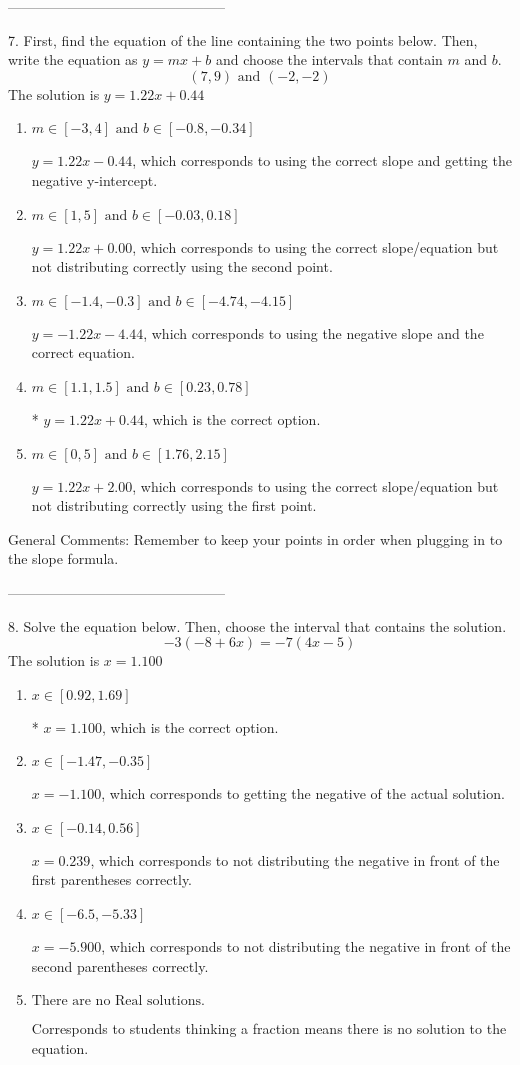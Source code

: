 \documentclass{extbook}[14pt]
\begin{document}
-----------------------------------------------

7. First, find the equation of the line containing the two points below. Then, write the equation as $ y=mx+b $ and choose the intervals that contain $m$ and $b$.
\[ (7, 9) \text{ and } (-2, -2) \] 
The solution is $ y = 1.22x + 0.44 $ 

\begin{enumerate}[label=\Alph*.] 
\item $ m \in [-3, 4] \text{ and } b \in [-0.8, -0.34] $ 

  $y = 1.22x - 0.44$, which corresponds to using the correct slope and getting the negative y-intercept. 
\item $ m \in [1, 5] \text{ and } b \in [-0.03, 0.18] $ 

  $y = 1.22x + 0.00$, which corresponds to using the correct slope/equation but not distributing correctly using the second point. 
\item $ m \in [-1.4, -0.3] \text{ and } b \in [-4.74, -4.15] $ 

  $y = -1.22x - 4.44$, which corresponds to using the negative slope and the correct equation. 
\item $ m \in [1.1, 1.5] \text{ and } b \in [0.23, 0.78] $ 

 * $y = 1.22x + 0.44$, which is the correct option. 
\item $ m \in [0, 5] \text{ and } b \in [1.76, 2.15] $ 

  $y = 1.22x + 2.00$, which corresponds to using the correct slope/equation but not distributing correctly using the first point. 
\end{enumerate} 
 
General Comments: Remember to keep your points in order when plugging in to the slope formula.

-----------------------------------------------

8. Solve the equation below. Then, choose the interval that contains the solution.
\[ -3(-8+6 x) = -7(4 x-5) \] 
The solution is $ x = 1.100 $ 

\begin{enumerate}[label=\Alph*.] 
\item $ x \in [0.92, 1.69] $ 

 * $x = 1.100$, which is the correct option. 
\item $ x \in [-1.47, -0.35] $ 

  $x = -1.100$, which corresponds to getting the negative of the actual solution. 
\item $ x \in [-0.14, 0.56] $ 

  $x = 0.239$, which corresponds to not distributing the negative in front of the first parentheses correctly. 
\item $ x \in [-6.5, -5.33] $ 

  $x = -5.900$, which corresponds to not distributing the negative in front of the second parentheses correctly. 
\item $ \text{There are no Real solutions. } $ 

 Corresponds to students thinking a fraction means there is no solution to the equation. 
\end{enumerate} 
 
\end{document}
